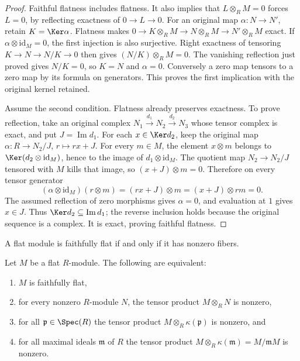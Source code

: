 \begin{proof}
Faithful flatness includes flatness. It also implies that
$L\otimes_R M=0$ forces $L=0$, by reflecting exactness
of $0\to L\to0$. For an original map $\alpha:N\to N'$,
retain $K=\Ker\alpha$. Flatness makes
$0\to K\otimes_R M\to N\otimes_R M\to N'\otimes_R M$
exact. If $\alpha\otimes\mathrm{id}_M=0$, the first
injection is also surjective. Right exactness of tensoring
$K\to N\to N/K\to0$ then gives $(N/K)\otimes_R M=0$.
The vanishing reflection just proved gives $N/K=0$, so
$K=N$ and $\alpha=0$. Conversely a zero map tensors
to a zero map by its formula on generators. This proves
the first implication with the original kernel retained.

Assume the second condition. Flatness already preserves
exactness. To prove reflection, take an original complex
$N_1\xrightarrow{d_1}N_2\xrightarrow{d_2}N_3$ whose
tensor complex is exact, and put $J=\operatorname{Im}d_1$.
For each $x\in\Ker d_2$, keep the original map
$\alpha:R\to N_2/J$, $r\mapsto rx+J$.
For every $m\in M$, the element $x\otimes m$ belongs to
$\Ker(d_2\otimes\mathrm{id}_M)$, hence to the image of
$d_1\otimes\mathrm{id}_M$. The quotient map $N_2\to N_2/J$
tensored with $M$ kills that image, so
$(x+J)\otimes m=0$. Therefore on every tensor generator
$$
(\alpha\otimes\mathrm{id}_M)(r\otimes m)
=(rx+J)\otimes m=(x+J)\otimes rm=0.
$$
The assumed reflection of zero morphisms gives $\alpha=0$,
and evaluation at $1$ gives $x\in J$. Thus
$\Ker d_2\subseteq\operatorname{Im}d_1$; the reverse
inclusion holds because the original sequence is a complex.
It is exact, proving faithful flatness.
\end{proof}

\begin{lemma}
\label{editorial-source-lemma-ff}
\begin{slogan}
A flat module is faithfully flat if and only if it has nonzero fibers.
\end{slogan}
Let $M$ be a flat $R$-module.
The following are equivalent:
\begin{enumerate}
\item $M$ is faithfully flat,
\item for every nonzero $R$-module $N$, the tensor product $M \otimes_R N$
is nonzero,
\item for all $\mathfrak p \in \Spec(R)$
the tensor product $M \otimes_R \kappa(\mathfrak p)$ is nonzero, and
\item for all maximal ideals $\mathfrak m$ of $R$
the tensor product $M \otimes_R \kappa(\mathfrak m) = M/{\mathfrak m}M$
is nonzero.
\end{enumerate}
\end{lemma}


